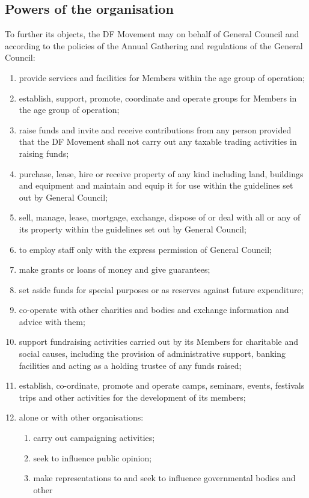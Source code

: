 \documentclass[a4paper, 11pt]{report}
\begin{document}
\subsection{Powers of the organisation}
To further its objects, the DF Movement may on behalf of General Council and according to the policies of the Annual Gathering and regulations of the General Council:
\begin{enumerate}
\item provide services and facilities for Members within the age group of operation;
\item establish, support, promote, coordinate and operate groups for Members in the age group of operation;
\item raise funds and invite and receive contributions from any person provided that the DF Movement shall not carry out any taxable trading activities in raising funds;
\item purchase, lease, hire or receive property of any kind including land, buildings and equipment and maintain and equip it for use within the guidelines set out by General Council;
\item sell, manage, lease, mortgage, exchange, dispose of or deal with all or any of its property within the guidelines set out by General Council;
\item to employ staff only with the express permission of General Council;
\item make grants or loans of money and give guarantees;
\item set aside funds for special purposes or as reserves against future expenditure;
\item co-operate with other charities and bodies and exchange information and advice with them;
\item support fundraising activities carried out by its Members for charitable and social causes, including the provision of administrative support, banking facilities and acting as a holding trustee of any funds raised;
\item establish, co-ordinate, promote and operate camps, seminars, events, festivals trips and other activities for the development of its members;
\item alone or with other organisations:
\begin{enumerate}
\item carry out campaigning activities;
\item seek to influence public opinion;
\item make representations to and seek to influence governmental bodies and other

\end{enumerate}
\end{enumerate}
\end{document}
